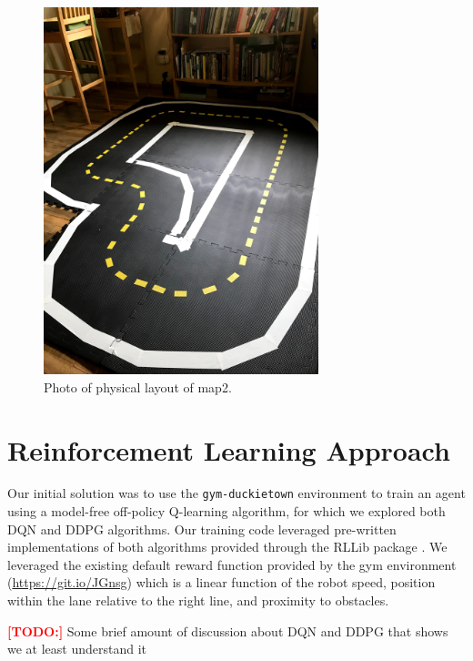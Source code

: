 \documentclass{article}
\newcommand\todo{\textcolor{red}{\textbf{[TODO:] }}}
\begin{document}
\begin{figure}[H]
\includegraphics[width=8cm,keepaspectratio]{map2_real}
\centering
\caption{Photo of physical layout of map2.}
\label{fig:map2_real}
\end{figure}

\section{Reinforcement Learning Approach}

Our initial solution was to use the \texttt{gym-duckietown} environment to train an agent using a model-free off-policy Q-learning algorithm, for which we explored both DQN \cite{DBLP:journals/corr/MnihKSGAWR13} and DDPG \cite{journals/corr/LillicrapHPHETS15} algorithms. Our training code leveraged pre-written implementations of both algorithms provided through the RLLib package \cite{DBLP:journals/corr/abs-1712-09381}. We leveraged the existing default reward function provided by the gym environment (\url{https://git.io/JGnsg}) which is a linear function of the robot speed, position within the lane relative to the right line, and proximity to obstacles.

\todo Some brief amount of discussion about DQN and DDPG that shows we at least understand it \\
\end{document}
